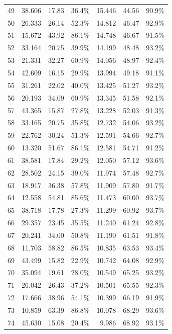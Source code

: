 \begin{longtable}{rrrrrrr}
    49 & 38.606 & 17.83 & 36.4\% & 15.446 & 44.56 & 90.9\% \\
    50 & 26.333 & 26.14 & 52.3\% & 14.812 & 46.47 & 92.9\% \\
    51 & 15.672 & 43.92 & 86.1\% & 14.748 & 46.67 & 91.5\% \\
    52 & 33.164 & 20.75 & 39.9\% & 14.199 & 48.48 & 93.2\% \\
    53 & 21.331 & 32.27 & 60.9\% & 14.056 & 48.97 & 92.4\% \\
    54 & 42.609 & 16.15 & 29.9\% & 13.994 & 49.18 & 91.1\% \\
    55 & 31.261 & 22.02 & 40.0\% & 13.425 & 51.27 & 93.2\% \\
    56 & 20.193 & 34.09 & 60.9\% & 13.345 & 51.58 & 92.1\% \\
    57 & 43.365 & 15.87 & 27.8\% & 13.228 & 52.03 & 91.3\% \\
    58 & 33.165 & 20.75 & 35.8\% & 12.732 & 54.06 & 93.2\% \\
    59 & 22.762 & 30.24 & 51.3\% & 12.591 & 54.66 & 92.7\% \\
    60 & 13.320 & 51.67 & 86.1\% & 12.581 & 54.71 & 91.2\% \\
    61 & 38.581 & 17.84 & 29.2\% & 12.050 & 57.12 & 93.6\% \\
    62 & 28.502 & 24.15 & 39.0\% & 11.974 & 57.48 & 92.7\% \\
    63 & 18.917 & 36.38 & 57.8\% & 11.909 & 57.80 & 91.7\% \\
    64 & 12.558 & 54.81 & 85.6\% & 11.473 & 60.00 & 93.7\% \\
    65 & 38.718 & 17.78 & 27.3\% & 11.299 & 60.92 & 93.7\% \\
    66 & 29.357 & 23.45 & 35.5\% & 11.240 & 61.24 & 92.8\% \\
    67 & 20.241 & 34.00 & 50.8\% & 11.190 & 61.51 & 91.8\% \\
    68 & 11.703 & 58.82 & 86.5\% & 10.835 & 63.53 & 93.4\% \\
    69 & 43.499 & 15.82 & 22.9\% & 10.742 & 64.08 & 92.9\% \\
    70 & 35.094 & 19.61 & 28.0\% & 10.549 & 65.25 & 93.2\% \\
    71 & 26.042 & 26.43 & 37.2\% & 10.501 & 65.55 & 92.3\% \\
    72 & 17.666 & 38.96 & 54.1\% & 10.399 & 66.19 & 91.9\% \\
    73 & 10.859 & 63.39 & 86.8\% & 10.078 & 68.29 & 93.6\% \\
    74 & 45.630 & 15.08 & 20.4\% & 9.986 & 68.92 & 93.1\% \\

\end{longtable}
